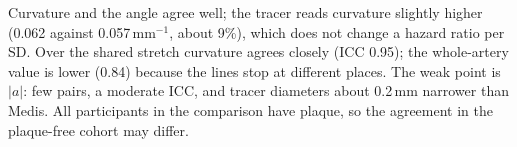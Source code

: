 \documentclass[11pt,a4paper]{article}
\begin{document}
Curvature and the angle agree well; the tracer reads curvature slightly higher (0.062 against 0.057\,mm$^{-1}$, about 9\%), which does
not change a hazard ratio per SD. Over the shared stretch curvature agrees closely (ICC 0.95); the whole-artery value is lower (0.84)
because the lines stop at different places. The weak point is $|a|$: few pairs, a moderate ICC, and tracer diameters about 0.2\,mm narrower
than Medis. All participants in the comparison have plaque, so the agreement in the plaque-free cohort may
differ.
\end{document}

